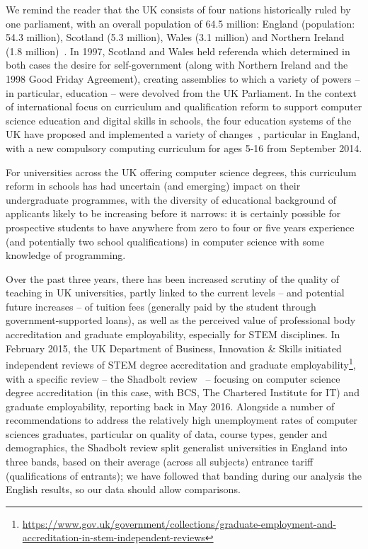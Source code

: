 \documentclass{sig-alternate}
\begin{document}
We remind the reader that the UK consists of four nations historically
ruled by one parliament, with an overall population of 64.5 million:
England (population: 54.3 million), Scotland (5.3 million), Wales (3.1
million) and Northern Ireland (1.8 million)~\cite{onspop:2016}. In
1997, Scotland and Wales held referenda which determined in both
cases the desire for self-government (along with Northern Ireland and
the 1998 Good Friday Agreement), creating assemblies to which a
variety of powers -- in particular, education -- were devolved from
the UK Parliament. In the context of international focus on curriculum
and qualification reform to support computer science education and
digital skills in schools, the four education systems of the UK have
proposed and implemented a variety of
changes~\cite{rs:2012,brown-et-al-toce2014}, particular in England,
with a new compulsory computing curriculum for ages 5-16 from
September 2014.

For universities across the UK offering computer science degrees, this
curriculum reform in schools has had uncertain (and emerging) impact
on their undergraduate programmes, with the diversity of educational
background of applicants likely to be increasing before it narrows: it
is certainly possible for prospective students to have anywhere from
zero to four or five years experience (and potentially two school
qualifications) in computer science with some knowledge of
programming.

Over the past three years, there has been increased scrutiny of the
quality of teaching in UK universities, partly linked to the current
levels -- and potential future increases -- of tuition fees (generally
paid by the student through government-supported loans), as well as the
perceived value of professional body accreditation and graduate
employability, especially for STEM disciplines. In February 2015, the
UK Department of Business, Innovation \& Skills 
initiated independent
reviews of STEM degree accreditation and graduate
employability\footnote{\url{https://www.gov.uk/government/collections/graduate-employment-and-accreditation-in-stem-independent-reviews}},
with a specific review -- the Shadbolt review~\cite{shadbolt:2016} --
focusing on computer science degree accreditation (in this case, with
BCS, The Chartered Institute for IT) and graduate employability,
reporting back in May 2016. Alongside a number of recommendations to
address the relatively high unemployment rates of computer sciences
graduates, particular on quality of data, course types, gender and
demographics, the Shadbolt review split generalist universities in
England into three bands, based on their average (across all subjects)
entrance tariff (qualifications of entrants); we have followed that
banding during our analysis the English results, so our data should
allow comparisons.
\end{document}

